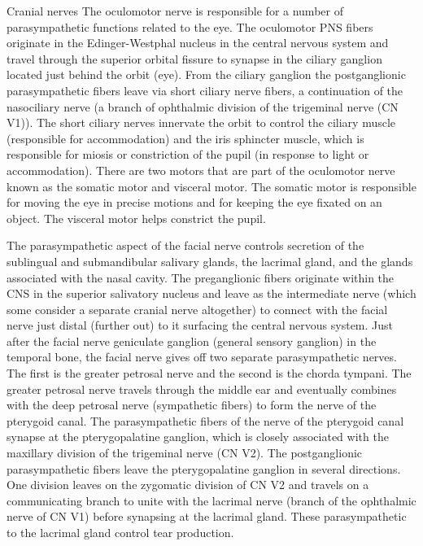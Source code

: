 \documentclass[]{book}
\begin{document}
Cranial nerves
The oculomotor nerve is responsible for a number of parasympathetic functions related to the eye. The oculomotor PNS fibers originate in the Edinger-Westphal nucleus in the central nervous system and travel through the superior orbital fissure to synapse in the ciliary ganglion located just behind the orbit (eye). From the ciliary ganglion the postganglionic parasympathetic fibers leave via short ciliary nerve fibers, a continuation of the nasociliary nerve (a branch of ophthalmic division of the trigeminal nerve (CN V1)). The short ciliary nerves innervate the orbit to control the ciliary muscle (responsible for accommodation) and the iris sphincter muscle, which is responsible for miosis or constriction of the pupil (in response to light or accommodation). There are two motors that are part of the oculomotor nerve known as the somatic motor and visceral motor. The somatic motor is responsible for moving the eye in precise motions and for keeping the eye fixated on an object. The visceral motor helps constrict the pupil.

The parasympathetic aspect of the facial nerve controls secretion of the sublingual and submandibular salivary glands, the lacrimal gland, and the glands associated with the nasal cavity. The preganglionic fibers originate within the CNS in the superior salivatory nucleus and leave as the intermediate nerve (which some consider a separate cranial nerve altogether) to connect with the facial nerve just distal (further out) to it surfacing the central nervous system. Just after the facial nerve geniculate ganglion (general sensory ganglion) in the temporal bone, the facial nerve gives off two separate parasympathetic nerves. The first is the greater petrosal nerve and the second is the chorda tympani. The greater petrosal nerve travels through the middle ear and eventually combines with the deep petrosal nerve (sympathetic fibers) to form the nerve of the pterygoid canal. The parasympathetic fibers of the nerve of the pterygoid canal synapse at the pterygopalatine ganglion, which is closely associated with the maxillary division of the trigeminal nerve (CN V2). The postganglionic parasympathetic fibers leave the pterygopalatine ganglion in several directions. One division leaves on the zygomatic division of CN V2 and travels on a communicating branch to unite with the lacrimal nerve (branch of the ophthalmic nerve of CN V1) before synapsing at the lacrimal gland. These parasympathetic to the lacrimal gland control tear production.
\end{document}
